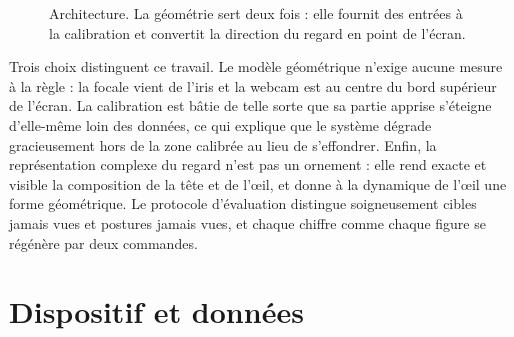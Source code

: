 \documentclass[10pt,a4paper]{article}
\begin{document}
\begin{figure}[!htbp]
\centering
{}
\caption{Architecture. La géométrie sert deux fois : elle fournit des entrées à la calibration et convertit la direction du regard en point de l'écran.}\label{fig:pipeline}
\end{figure}

Trois choix distinguent ce travail. Le modèle géométrique n'exige aucune mesure à la règle : la focale vient de l'iris et la webcam est au centre du bord supérieur de l'écran. La calibration est bâtie de telle sorte que sa partie apprise s'éteigne d'elle-même loin des données, ce qui explique que le système dégrade gracieusement hors de la zone calibrée au lieu de s'effondrer. Enfin, la représentation complexe du regard n'est pas un ornement : elle rend exacte et visible la composition de la tête et de l'œil, et donne à la dynamique de l'œil une forme géométrique. Le protocole d'évaluation distingue soigneusement cibles jamais vues et postures jamais vues, et chaque chiffre comme chaque figure se régénère par deux commandes.

\section{Dispositif et données}\label{sec:data}
\end{document}

